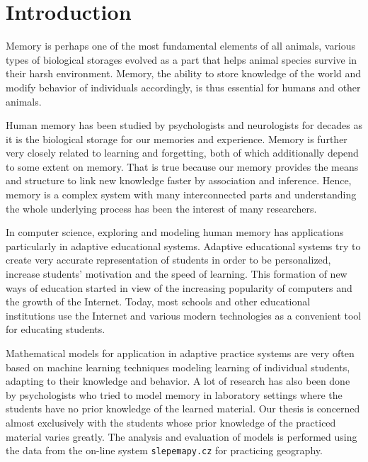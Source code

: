 \chapter{Introduction}

Memory is perhaps one of the most fundamental elements of all animals, various types of biological storages evolved as a part that helps animal species survive in their harsh environment. Memory, the ability to store knowledge of the world and modify behavior of individuals accordingly, is thus essential for humans and other animals.

Human memory has been studied by psychologists and neurologists for decades as it is the biological storage for our memories and experience. Memory is further very closely related to learning and forgetting, both of which additionally depend to some extent on memory. That is true because our memory provides the means and structure to link new knowledge faster by association and inference. Hence, memory is a complex system with many interconnected parts and understanding the whole underlying process has been the interest of many researchers.

In computer science, exploring and modeling human memory has applications particularly in adaptive educational systems. Adaptive educational systems try to create very accurate representation of students in order to be personalized, increase students' motivation and the speed of learning. This formation of new ways of education started in view of the increasing popularity of computers and the growth of the Internet. Today, most schools and other educational institutions use the Internet and various modern technologies as a convenient tool for educating students.

Mathematical models for application in adaptive practice systems are very often based on machine learning techniques modeling learning of individual students, adapting to their knowledge and behavior. A lot of research has also been done by psychologists who tried to model memory in laboratory settings where the students have no prior knowledge of the learned material. Our thesis is concerned almost exclusively with the students whose prior knowledge of the practiced material varies greatly. The analysis and evaluation of models is performed using the data from the on-line system \texttt{slepemapy.cz} for practicing geography.
